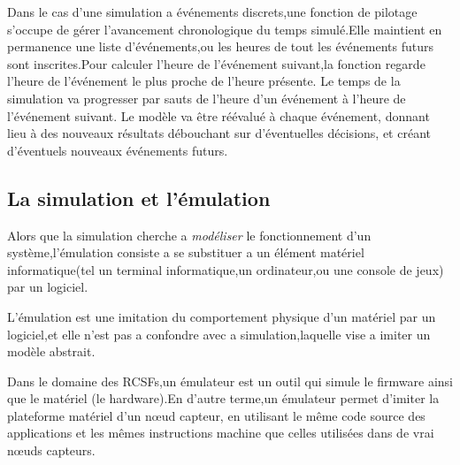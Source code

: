 Dans le cas d'une simulation a événements discrets,une fonction de pilotage s'occupe de gérer l’avancement chronologique du temps simulé.Elle maintient en permanence une liste d'événements,ou les heures de tout les événements futurs sont inscrites.Pour calculer l’heure de l’événement suivant,la fonction regarde l’heure de l’événement le plus proche de l’heure présente. Le temps de la simulation va progresser par sauts de l’heure d’un événement à l’heure de l’événement suivant. Le modèle va être réévalué à chaque événement, donnant lieu à des nouveaux résultats débouchant sur d’éventuelles décisions, et créant d’éventuels nouveaux événements futurs.



\subsection{La simulation et l'émulation}
Alors que la simulation cherche a \emph{modéliser} le fonctionnement d'un système,l'émulation consiste a se substituer a un élément matériel informatique(tel un terminal informatique,un ordinateur,ou une console de jeux) par un logiciel.

L'émulation est une imitation du comportement physique d'un matériel par un logiciel,et elle n'est pas a confondre avec a simulation,laquelle vise a imiter un modèle abstrait.

Dans le domaine des RCSFs,un émulateur  est un outil qui simule le firmware ainsi que le matériel (le hardware).En d'autre terme,un émulateur permet d'imiter la plateforme matériel d'un nœud capteur, en utilisant le même code source des applications et les mêmes instructions machine que celles utilisées dans de vrai nœuds capteurs. 


